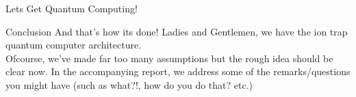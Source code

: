 \documentclass[final,hyperref={pdfpagelabels=false}]{beamer}
\begin{document}
\begin{frame}[t]
\begin{columns}[t]
\begin{column}{.465\textwidth}
\begin{block}{Lets Get Quantum Computing!}
     
\end{block}


\begin{block}{Conclusion}
	And that's how its done! Ladies and Gentlemen, we have the ion trap
	quantum computer architecture. \\
	Ofcourse, we've made far too many assumptions but the rough idea should
	be clear now. In the accompanying report, we address some of
	the remarks/questions you might have (such as what?!, how do
	you do that? etc.)
\end{block}








\end{column}
\end{columns}
\end{frame}
\end{document}
